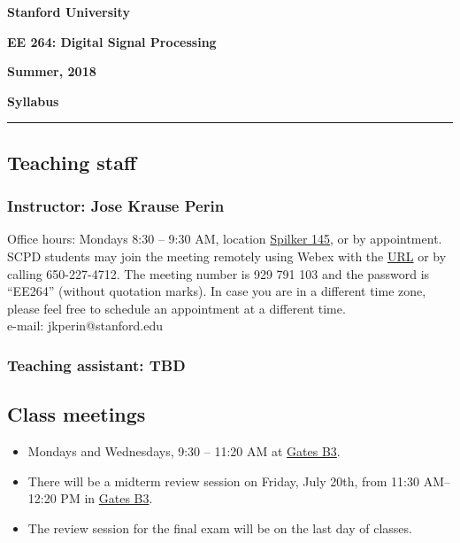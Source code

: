 \documentclass[10pt]{article}
\begin{document}
\doublespacing
\begin{center}
	\textbf{\large Stanford University}
	
	\textbf{\large EE 264: Digital Signal Processing}
	
	\textbf{\large Summer, 2018}
	
	\vspace{2mm}
	
	\textbf{\large Syllabus}
\end{center}
\vspace{-5mm}
\rule{\textwidth}{0.5pt}
\singlespacing

\subsection*{Teaching staff} 

\subsubsection*{Instructor: Jose Krause Perin} 
Office hours: Mondays 8:30 -- 9:30 AM, location \href{https://campus-map.stanford.edu/?id=04-040&lat=37.42879024&lng=-122.1740029&zoom=17&srch=Spilker}{Spilker 145}, or by appointment. \\
SCPD students may join the meeting remotely using Webex with the \href{https://stanford.webex.com/stanford-en/j.php?MTID=m07046ca0da0ed2a46b9a203fa6707fb4}{URL} or by calling 650-227-4712. The meeting number is 929 791 103 and the password is ``EE264'' (without quotation marks). In case you are in a different time zone, please feel free to schedule an appointment at a different time. \\
e-mail: jkperin@stanford.edu

\subsubsection*{Teaching assistant: TBD} 

\subsection*{Class meetings} 
\begin{itemize}
	\item Mondays and Wednesdays, 9:30 -- 11:20 AM at \href{https://campus-map.stanford.edu/?srch=Gates+Computer+Science}{Gates B3}.
	\item There will be a midterm review session on Friday, July 20th, from 11:30 AM-- 12:20 PM in \href{https://campus-map.stanford.edu/?srch=Gates+Computer+Science}{Gates B3}.
	\item The review session for the final exam will be on the last day of classes.
\end{itemize}
\end{document}
